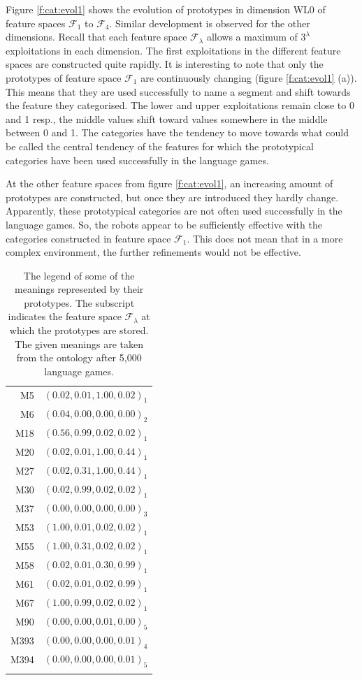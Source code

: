 Figure \ref{f:cat:evol1} shows the evolution of prototypes in dimension WL0 of feature spaces ${\mathcal F}_1$ to ${\mathcal F}_4$. Similar development is observed for the other dimensions. Recall that each feature space ${\mathcal F}_\lambda$ allows a maximum of $3^\lambda$ exploitations in each dimension. The first exploitations in the different feature spaces are constructed quite rapidly. It is interesting to note that only the prototypes of feature space ${\mathcal F}_1$  are continuously changing (figure \ref{f:cat:evol1} (a)). This means that they are used successfully to name a segment and shift towards the feature they categorised. The lower and upper exploitations remain close to 0 and 1 resp., the middle values shift toward values somewhere in the middle between 0 and 1. The categories have the tendency to move towards what could be called the central tendency of the features for which the prototypical categories have been used successfully in the language games. 

At the other feature spaces from figure \ref{f:cat:evol1}, an increasing amount of prototypes are constructed, but once they are introduced they hardly change. Apparently, these prototypical categories are not often used successfully in the language games. So, the robots appear to be sufficiently effective with the categories constructed in feature space ${\mathcal F}_1$. This does not mean that in a more complex environment, the further refinements would not be effective.

\begin{table}
\centering
\begin{tabular}{rr}
\lsptoprule
M5 & $(0.02, 0.01, 1.00, 0.02)_1$\\%
M6 & $(0.04, 0.00, 0.00, 0.00)_2$\\%
M18 & $(0.56, 0.99, 0.02, 0.02)_1$\\%
M20 & $(0.02, 0.01, 1.00, 0.44)_1$\\%
M27 & $(0.02, 0.31, 1.00, 0.44)_1$\\%
M30 & $(0.02, 0.99, 0.02, 0.02)_1$\\%
M37 & $(0.00, 0.00, 0.00, 0.00)_3$\\%
M53 & $(1.00, 0.01, 0.02, 0.02)_1$\\%
M55 & $(1.00, 0.31, 0.02, 0.02)_1$\\%
M58 & $(0.02, 0.01, 0.30, 0.99)_1$\\%
M61 & $(0.02, 0.01, 0.02, 0.99)_1$\\%
M67 & $(1.00, 0.99, 0.02, 0.02)_1$\\%
M90 & $(0.00, 0.00, 0.01, 0.00)_5$\\%
M393 & $(0.00, 0.00, 0.00, 0.01)_4$\\%
M394 & $(0.00, 0.00, 0.00, 0.01)_5$\\%
\lspbottomrule
\end{tabular}
\caption{The legend of some of the meanings represented by their prototypes. The subscript indicates the feature space ${\mathcal F}_\lambda$ at which the prototypes are stored. The given meanings are taken from the ontology after 5,000 language games.}
\label{t:st:legend}
\end{table}


